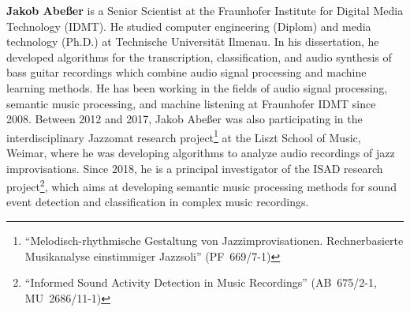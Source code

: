 \documentclass[11pt]{article}
\begin{document}
\noindent\textbf{Jakob Abeßer} 
is a Senior Scientist at the Fraunhofer Institute for Digital Media Technology (IDMT). He studied computer engineering (Diplom) and media technology (Ph.D.) at Technische Universität Ilmenau. 
In his dissertation, he developed algorithms for the transcription, classification, and audio synthesis of bass guitar recordings  which combine audio signal processing and machine learning methods.
He has been working in the fields of audio signal processing, semantic music processing, and machine listening at Fraunhofer IDMT since 2008.
Between 2012 and 2017, Jakob Abeßer was also participating in the interdisciplinary Jazzomat research project\footnote{“Melodisch-rhythmische Gestaltung von Jazzimprovisationen. Rechnerbasierte Musikanalyse einstimmiger Jazzsoli” (\mbox{PF 669/7-1})} at the Liszt School of Music, Weimar, where he was developing algorithms to analyze audio recordings of jazz improvisations. %
Since 2018, he is a principal investigator of the ISAD research project\footnote{``Informed Sound Activity Detection in Music Recordings'' (\mbox{AB 675/2-1}, \mbox{MU 2686/11-1})}, which aims at developing semantic music processing methods for sound event detection and classification in complex music recordings.
\end{document}
